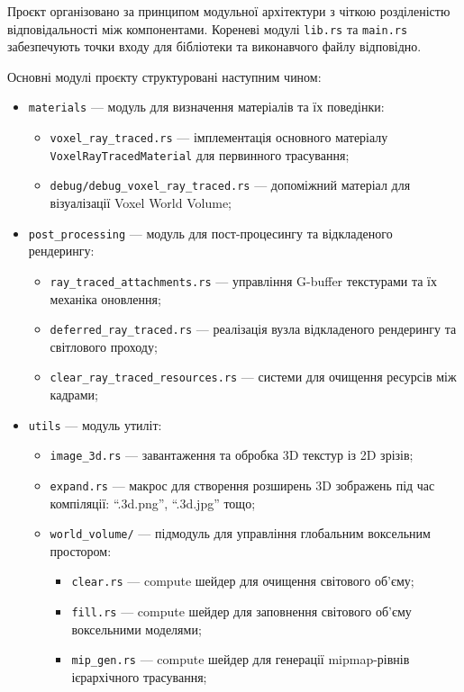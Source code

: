 Проєкт організовано за принципом модульної архітектури з чіткою розділеністю відповідальності між компонентами. Кореневі модулі \texttt{lib.rs} та \texttt{main.rs} забезпечують точки входу для бібліотеки та виконавчого файлу відповідно.

Основні модулі проєкту структуровані наступним чином:

\begin{itemize}[itemsep=0pt, topsep=0pt, label=$\diamond$]
    \item \texttt{materials} --- модуль для визначення матеріалів та їх поведінки:
    \begin{itemize}
        \item \texttt{voxel\_ray\_traced.rs} --- імплементація основного матеріалу\\ \texttt{VoxelRayTracedMaterial} для первинного трасування;
        \item \texttt{debug/debug\_voxel\_ray\_traced.rs} --- допоміжний матеріал для візуалізації Voxel World Volume;
    \end{itemize}
    \item \texttt{post\_processing} --- модуль для пост-процесингу та відкладеного рендерингу:
    \begin{itemize}
        \item \texttt{ray\_traced\_attachments.rs} --- управління G-buffer текстурами та їх механіка оновлення;
        \item \texttt{deferred\_ray\_traced.rs} --- реалізація вузла відкладеного рендерингу та світлового проходу;
        \item \texttt{clear\_ray\_traced\_resources.rs} --- системи для очищення ресурсів між кадрами;
    \end{itemize}
    \item \texttt{utils} --- модуль утиліт:
    \begin{itemize}
        \item \texttt{image\_3d.rs} --- завантаження та обробка 3D текстур із 2D зрізів;
        \item \texttt{expand.rs} --- макрос для створення розширень 3D зображень під час компіляції: ``.3d.png'', ``.3d.jpg'' тощо;
        \item \texttt{world\_volume/} --- підмодуль для управління глобальним воксельним простором:
        \begin{itemize}
            \item \texttt{clear.rs} --- compute шейдер для очищення світового об'єму;
            \item \texttt{fill.rs} --- compute шейдер для заповнення світового об'єму воксельними моделями;
            \item \texttt{mip\_gen.rs} --- compute шейдер для генерації mipmap-рівнів ієрархічного трасування;
        \end{itemize}
    \end{itemize}
\end{itemize}

